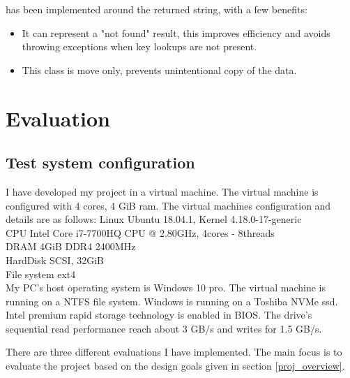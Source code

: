 \documentclass[bsc,frontabs,twoside,singlespacing,parskip,deptreport]{infthesis}     %
\begin{document}
{%
has been implemented around the returned string, with a few benefits: 
\begin{itemize}
\item It can represent a "not found" result, this improves efficiency and avoids throwing exceptions when key lookups are not present. 
\item This class is move only, prevents unintentional copy of the data.
\end{itemize}

\chapter{Evaluation}
\section{Test system configuration}
I have developed my project in a virtual machine. The virtual machine is configured with 4 cores, 4 GiB ram. The virtual machines configuration and details are as follows: 
\tab Linux \tab Ubuntu 18.04.1, Kernel 4.18.0-17-generic
\\
\tab  CPU \tab Intel Core i7-7700HQ CPU @ 2.80GHz, 4cores - 8threads
\\
\tab DRAM \tab 4GiB DDR4 2400MHz
\\
\tab HardDisk \tab SCSI, 32GiB
\\
\tab File system \tab ext4
\\
My PC's host operating system is Windows 10 pro. The virtual machine is running on a NTFS file system. Windows is running on a Toshiba NVMe ssd. Intel premium rapid storage technology is enabled in BIOS. The drive's sequential read performance reach about 3 GB/s and writes for 1.5 GB/s.

There are three different evaluations I have implemented. The main focus is to evaluate the project based on the design goals  given in section \ref{proj_overview}.

}
\end{document}
